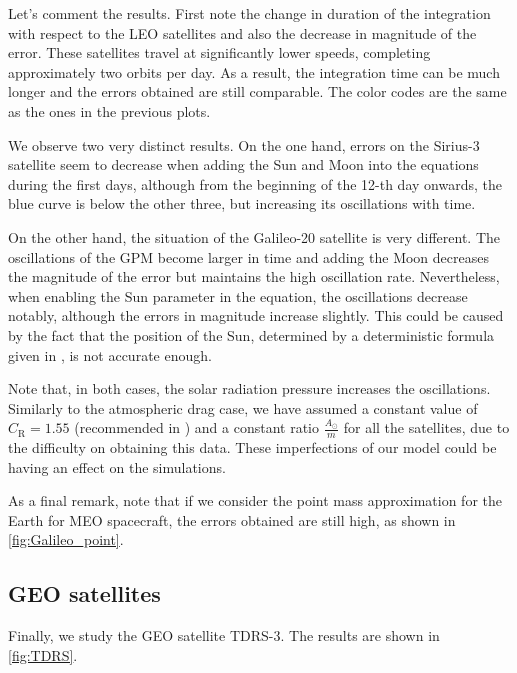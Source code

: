 \documentclass[../main.tex]{subfiles}
\begin{document}
Let's comment the results. First note the change in duration of the integration with respect to the LEO satellites and also the decrease in magnitude of the error. These satellites travel at significantly lower speeds, completing approximately two orbits per day. As a result, the integration time can be much longer and the errors obtained are still comparable. The color codes are the same as the ones in the previous plots.

We observe two very distinct results. On the one hand, errors on the Sirius-3 satellite seem to decrease when adding the Sun and Moon into the equations during the first days, although from the beginning of the 12-th day onwards, the blue curve is below the other three, but increasing its oscillations with time.

On the other hand, the situation of the Galileo-20 satellite is very different. The oscillations of the GPM become larger in time and adding the Moon decreases the magnitude of the error but maintains the high oscillation rate. Nevertheless, when enabling the Sun parameter in the equation, the oscillations decrease notably, although the errors in magnitude increase slightly. This could be caused by the fact that the position of the Sun, determined by a deterministic formula given in \cite{montenbruck}, is not accurate enough.

Note that, in both cases, the solar radiation pressure increases the oscillations. Similarly to the atmospheric drag case, we have assumed a constant value of $C_\mathrm{R}=1.55$ (recommended in \cite{montenbruck}) and a constant ratio $\frac{A_\odot}{m}$ for all the satellites, due to the difficulty on obtaining this data. These imperfections of our model could be having an effect on the simulations.

As a final remark, note that if we consider the point mass approximation for the Earth for MEO spacecraft, the errors obtained are still high, as shown in \cref{fig:Galileo_point}.

\subsection{GEO satellites}
Finally, we study the GEO satellite TDRS-3. The results are shown in \cref{fig:TDRS}.
\end{document}
